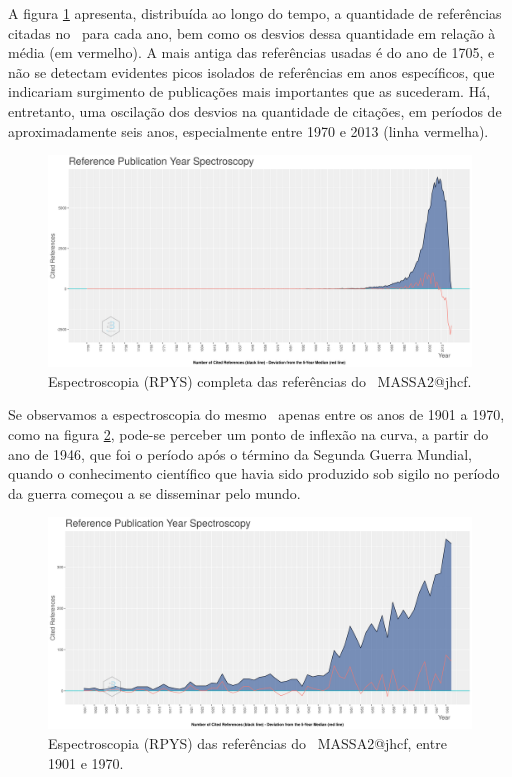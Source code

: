 A figura \ref{fig:MASSA2-ReferenceSpectroscopy} apresenta, distribuída ao longo do tempo, a quantidade de referências citadas no \dataset\, para cada ano, bem como os desvios dessa quantidade em relação à média (em vermelho). A mais antiga das referências usadas é do ano de 1705, e não se detectam evidentes picos isolados de referências em anos específicos, que indicariam surgimento de publicações mais importantes que as sucederam. Há, entretanto, uma oscilação dos desvios na quantidade de citações, em períodos de aproximadamente seis anos, especialmente entre 1970 e 2013 (linha vermelha).

\begin{figure}
    \centering
    \includegraphics[width=1\textwidth]{experiments/jhcf/PesqBibliogr/SimulacaoMultiagente/WoS-20220203/Metricas/Documentos/MASSA2-ReferenceSpectroscopy.png}
    \caption{Espectroscopia (RPYS) completa das referências do \dataset\ MASSA2@jhcf.}
    \label{fig:MASSA2-ReferenceSpectroscopy}
\end{figure}

Se observamos a espectroscopia do mesmo \dataset\ apenas entre os anos de 1901 a 1970, como na figura \ref{fig:MASSA2-ReferenceSpectroscopy:1901:1970}, pode-se perceber um ponto de inflexão na curva, a partir do ano de 1946, que foi o período após o término da Segunda Guerra Mundial, quando o conhecimento científico que havia sido produzido sob sigilo no período da guerra começou a se disseminar pelo mundo.

\begin{figure}
    \centering
    \includegraphics[width=1\textwidth]{experiments/jhcf/PesqBibliogr/SimulacaoMultiagente/WoS-20220203/Metricas/Documentos/MASSA2-ReferenceSpectroscopy-1901-1970.png}
    \caption{Espectroscopia (RPYS) das referências do \dataset\ MASSA2@jhcf, entre 1901 e 1970.}
    \label{fig:MASSA2-ReferenceSpectroscopy:1901:1970}
\end{figure}
    
